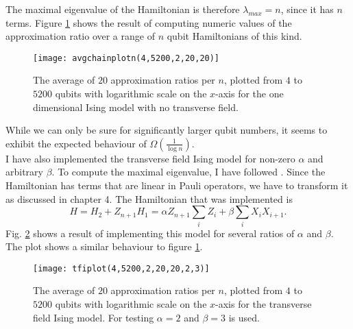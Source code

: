 The maximal eigenvalue of the Hamiltonian is therefore $\lambda_{max}=n$, since it has $n$ terms.
Figure \ref{fig:1} shows the result of computing numeric values of the approximation ratio over a range of $n$ qubit Hamiltonians of this kind.
\begin{figure}[H]
	\centering
	\texttt{[image: avgchainplotn(4,5200,2,20,20)]}
	\caption{The average of $20$ approximation ratios per $n$, plotted from $4$ to $5200$ qubits with logarithmic scale on the $x$-axis for the one dimensional Ising model with no transverse field.}
	\label{fig:1}
\end{figure}
\noindent While we can only be sure for significantly larger qubit numbers, it seems to exhibit the expected behaviour of $\Omega(\frac{1}{\log{}n})$.\\
I have also implemented the transverse field Ising model for non-zero $\alpha$ and arbitrary $\beta$.
To compute the maximal eigenvalue, I have followed \cite{pfeuty70}.
Since the Hamiltonian has terms that are linear in Pauli operators, we have to transform it as discussed in chapter 4.
The Hamiltonian that was implemented is \[
H = H_2 + Z_{n+1}H_1 =\alpha Z_{n+1}\sum_{i} Z_i + \beta \sum_{i} X_iX_{i+1}
.\]
Fig. \ref{fig:2} shows a result of implementing this model for several ratios of $\alpha$ and $\beta$.
The plot shows a similar behaviour to figure \ref{fig:1}.
\begin{figure}[H]
	\centering
	\texttt{[image: tfiplot(4,5200,2,20,20,2,3)]}
	\caption{The average of $20$ approximation ratios per $n$, plotted from $4$ to $5200$ qubits with logarithmic scale on the $x$-axis for the transverse field Ising model. For testing $\alpha=2$ and $\beta=3$ is used.}
	\label{fig:2}
\end{figure}

